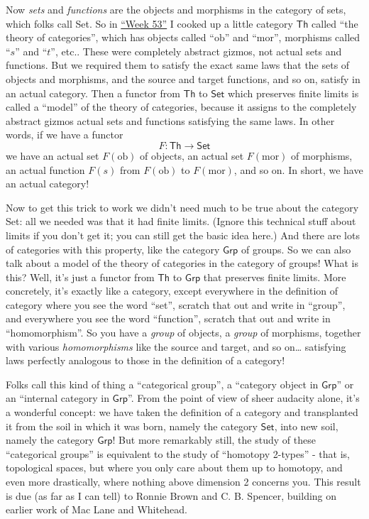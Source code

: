 \documentclass{article}
\begin{document}
Now \emph{sets} and \emph{functions} are the objects and morphisms in
the category of sets, which folks call Set. So in
\protect\hyperlink{week53}{``Week 53''} I cooked up a little category
\(\mathsf{Th}\) called ``the theory of categories'', which has objects
called ``\(\mathrm{ob}\)'' and ``\(\mathrm{mor}\)'', morphisms called
``\(s\)'' and ``\(t\)'', etc.. These were completely abstract gizmos,
not actual sets and functions. But we required them to satisfy the exact
same laws that the sets of objects and morphisms, and the source and
target functions, and so on, satisfy in an actual category. Then a
functor from \(\mathsf{Th}\) to \(\mathsf{Set}\) which preserves finite
limits is called a ``model'' of the theory of categories, because it
assigns to the completely abstract gizmos actual sets and functions
satisfying the same laws. In other words, if we have a functor
\[F\colon\mathsf{Th}\to\mathsf{Set}\] we have an actual set
\(F(\mathrm{ob})\) of objects, an actual set \(F(\mathrm{mor})\) of
morphisms, an actual function \(F(s)\) from \(F(\mathrm{ob})\) to
\(F(\mathrm{mor})\), and so on. In short, we have an actual category!

Now to get this trick to work we didn't need much to be true about the
category Set: all we needed was that it had finite limits. (Ignore this
technical stuff about limits if you don't get it; you can still get the
basic idea here.) And there are lots of categories with this property,
like the category \(\mathsf{Grp}\) of groups. So we can also talk about
a model of the theory of categories in the category of groups! What is
this? Well, it's just a functor from \(\mathsf{Th}\) to \(\mathsf{Grp}\)
that preserves finite limits. More concretely, it's exactly like a
category, except everywhere in the definition of category where you see
the word ``set'', scratch that out and write in ``group'', and
everywhere you see the word ``function'', scratch that out and write in
``homomorphism''. So you have a \emph{group} of objects, a \emph{group}
of morphisms, together with various \emph{homomorphisms} like the source
and target, and so on\ldots{} satisfying laws perfectly analogous to
those in the definition of a category!

Folks call this kind of thing a ``categorical group'', a ``category
object in \(\mathsf{Grp}\)'' or an ``internal category in
\(\mathsf{Grp}\)''. From the point of view of sheer audacity alone, it's
a wonderful concept: we have taken the definition of a category and
transplanted it from the soil in which it was born, namely the category
\(\mathsf{Set}\), into new soil, namely the category \(\mathsf{Grp}\)!
But more remarkably still, the study of these ``categorical groups'' is
equivalent to the study of ``homotopy 2-types'' - that is, topological
spaces, but where you only care about them up to homotopy, and even more
drastically, where nothing above dimension 2 concerns you. This result
is due (as far as I can tell) to Ronnie Brown and C. B. Spencer,
building on earlier work of Mac Lane and Whitehead.
\end{document}
